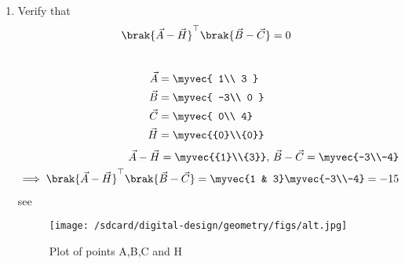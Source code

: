 \documentclass[11pt]{book}
\begin{document}
\begin{enumerate}[label=\thesection.\arabic*.,ref=\thesection.\theenumi]
\item Verify that 
		\begin{align}
			\brak{\vec{A}-\vec{H}}^{\top}\brak{\vec{B}-\vec{C}} = 0
		\end{align}
\\  \solution
 \begin{align} 
 \vec{A} &= \myvec{ 1\\ 3 } \\ \vec{B} &= \myvec{ -3\\ 0 }
  \\\vec{C} &= \myvec{ 0\\ 4} \\ \vec{H} &=\myvec{{0}\\{0}}
 \end{align}
\begin{align}
\vec{A}-\vec{H}=\myvec{{1}\\{3}},\,
\vec{B}-\vec{C}=\myvec{-3\\-4}
\\
	\implies \brak{\vec{A}-\vec{H}}^{\top}\brak{\vec{B}-\vec{C}}=\myvec{1 & 3}
\myvec{-3\\-4}
=-15
\end{align}
see 
\begin{figure}
    \centering
    \texttt{[image: /sdcard/digital-design/geometry/figs/alt.jpg]}
    \caption{Plot of points A,B,C and H}
    \label{fig:Pts_ABCH}
\end{figure}



\end{enumerate}
\end{document}
